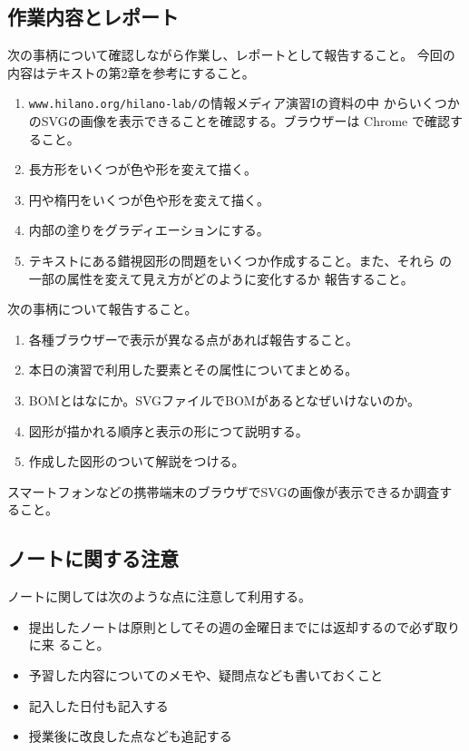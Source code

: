 \documentclass[a4j]{jarticle}
\begin{document}
\subsection{作業内容とレポート}
次の事柄について確認しながら作業し、レポートとして報告すること。
今回の内容はテキストの第2章を参考にすること。
\begin{enumerate}
 \item \texttt{www.hilano.org/hilano-lab/}の情報メディア演習Iの資料の中
       からいくつかのSVGの画像を表示できることを確認する。ブラウザーは
       Chrome で確認すること。
 \item 長方形をいくつが色や形を変えて描く。
 \item 円や楕円をいくつが色や形を変えて描く。
 \item 内部の塗りをグラディエーションにする。
 \item テキストにある錯視図形の問題をいくつか作成すること。また、それら
       の一部の属性を変えて見え方がどのように変化するか
       報告すること。
\end{enumerate}
\begin{Report}\upshape
次の事柄について報告すること。
\begin{enumerate}
 \item 各種ブラウザーで表示が異なる点があれば報告すること。
 \item 本日の演習で利用した要素とその属性についてまとめる。
 \item BOMとはなにか。SVGファイルでBOMがあるとなぜいけないのか。
 \item 図形が描かれる順序と表示の形につて説明する。
 \item 作成した図形のついて解説をつける。
\end{enumerate}
\end{Report}
\begin{Report}[余力問題]\upshape
 スマートフォンなどの携帯端末のブラウザでSVGの画像が表示できるか調査すること。
\end{Report}
\newpage

\subsection{ノートに関する注意}
ノートに関しては次のような点に注意して利用する。
\begin{itemize}
 \item 提出したノートは原則としてその週の金曜日までには返却するので必ず取りに来
ること。
 \item 予習した内容についてのメモや、疑問点なども書いておくこと
 \item 記入した日付も記入する
 \item 授業後に改良した点なども追記する
\end{itemize}
\end{document}
